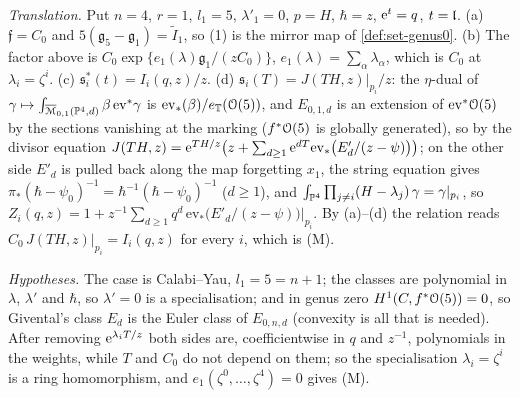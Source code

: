 \emph{Translation.} Put $n=4$, $r=1$, $l_1=5$, $\lambda'_1=0$, $p=H$, $\hbar=z$, $\mathrm{e}^t=q$, $t=\mathfrak{l}$. (a) $\mathfrak f=C_0$ and $5(\mathfrak g_5-\mathfrak g_1)=\tilde I_1$, so (1) is the mirror map of \cref{def:set-genus0}. (b) The factor above is $C_0\exp\{e_1(\lambda)\mathfrak g_1/(zC_0)\}$, $e_1(\lambda)=\sum_\alpha\lambda_\alpha$, which is $C_0$ at $\lambda_i=\zeta^i$. (c) $\mathfrak s_i^*(t)=I_i(q,z)/z$. (d) $\mathfrak s_i(T)=J(TH,z)|_{p_i}/z$: the $\eta$-dual of $\gamma\mapsto\int_{\overline{\mathcal M}_{0,1}(\mathbb{P}^4,d)}\beta\,\mathrm{ev}^*\gamma$ is $\mathrm{ev}_*(\beta)/e_{\mathbb{T}}(\mathcal{O}(5))$, and $E_{0,1,d}$ is an extension of $\mathrm{ev}^*\mathcal{O}(5)$ by the sections vanishing at the marking ($f^*\mathcal{O}(5)$ is globally generated), so by the divisor equation $J(TH,z)=\mathrm{e}^{TH/z}\bigl(z+\sum_{d\geq1}\mathrm{e}^{dT}\mathrm{ev}_*\bigl(E'_d/(z-\psi)\bigr)\bigr)$; on the other side $E'_d$ is pulled back along the map forgetting $x_1$, the string equation gives $\pi_*(\hbar-\psi_0)^{-1}=\hbar^{-1}(\hbar-\psi_0)^{-1}$ ($d\geq1$), and $\int_{\mathbb{P}^4}\prod_{j\neq i}(H-\lambda_j)\,\gamma=\gamma|_{p_i}$, so $Z_i(q,z)=1+z^{-1}\sum_{d\geq1}q^d\,\mathrm{ev}_*\bigl(E'_d/(z-\psi)\bigr)|_{p_i}$. By (a)--(d) the relation reads $C_0\,J(TH,z)|_{p_i}=I_i(q,z)$ for every $i$, which is (M).

\emph{Hypotheses.} The case is Calabi--Yau, $l_1=5=n+1$; the classes are polynomial in $\lambda$, $\lambda'$ and $\hbar$, so $\lambda'=0$ is a specialisation; and in genus zero $H^1(C,f^*\mathcal{O}(5))=0$, so Givental's class $E_d$ is the Euler class of $E_{0,n,d}$ (convexity is all that is needed). After removing $\mathrm{e}^{\lambda_iT/z}$ both sides are, coefficientwise in $q$ and $z^{-1}$, polynomials in the weights, while $T$ and $C_0$ do not depend on them; so the specialisation $\lambda_i=\zeta^i$ is a ring homomorphism, and $e_1(\zeta^0,\dots,\zeta^4)=0$ gives (M).

